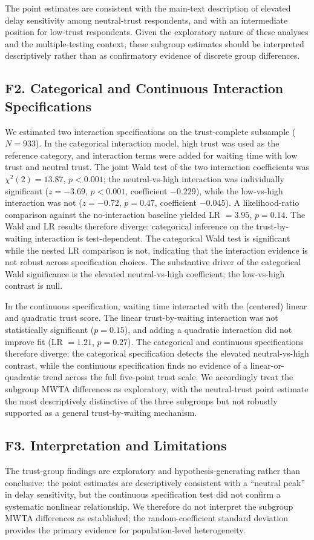The point estimates are consistent with the main-text description of elevated delay sensitivity among neutral-trust respondents, and with an intermediate position for low-trust respondents. Given the exploratory nature of these analyses and the multiple-testing context, these subgroup estimates should be interpreted descriptively rather than as confirmatory evidence of discrete group differences.

\subsection*{F2. Categorical and Continuous Interaction Specifications}

We estimated two interaction specifications on the trust-complete subsample ($N = 933$). In the categorical interaction model, high trust was used as the reference category, and interaction terms were added for waiting time with low trust and neutral trust. The joint Wald test of the two interaction coefficients was $\chi^2(2) = 13.87$, $p < 0.001$; the neutral-vs-high interaction was individually significant ($z = -3.69$, $p < 0.001$, coefficient $-0.229$), while the low-vs-high interaction was not ($z = -0.72$, $p = 0.47$, coefficient $-0.045$). A likelihood-ratio comparison against the no-interaction baseline yielded LR $= 3.95$, $p = 0.14$. The Wald and LR results therefore diverge: categorical inference on the trust-by-waiting interaction is test-dependent. The categorical Wald test is significant while the nested LR comparison is not, indicating that the interaction evidence is not robust across specification choices. The substantive driver of the categorical Wald significance is the elevated neutral-vs-high coefficient; the low-vs-high contrast is null.

In the continuous specification, waiting time interacted with the (centered) linear and quadratic trust score. The linear trust-by-waiting interaction was not statistically significant ($p = 0.15$), and adding a quadratic interaction did not improve fit (LR $= 1.21$, $p = 0.27$). The categorical and continuous specifications therefore diverge: the categorical specification detects the elevated neutral-vs-high contrast, while the continuous specification finds no evidence of a linear-or-quadratic trend across the full five-point trust scale. We accordingly treat the subgroup MWTA differences as exploratory, with the neutral-trust point estimate the most descriptively distinctive of the three subgroups but not robustly supported as a general trust-by-waiting mechanism.

\subsection*{F3. Interpretation and Limitations}

The trust-group findings are exploratory and hypothesis-generating rather than conclusive: the point estimates are descriptively consistent with a ``neutral peak'' in delay sensitivity, but the continuous specification test did not confirm a systematic nonlinear relationship. We therefore do not interpret the subgroup MWTA differences as established; the random-coefficient standard deviation provides the primary evidence for population-level heterogeneity.
\clearpage
